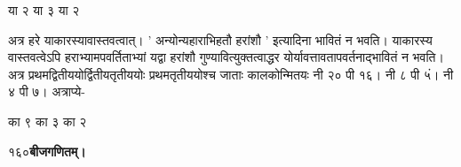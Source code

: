 \documentclass[11pt, openany]{book}
\begin{document}
\begin{sloppypar}
\hspace{0.75in}या २\hspace{0.85in} या ३\hspace{0.8in} या २

\hangindent=0.2in अत्र हरे याकारस्यावास्तवत्वात्। ' अन्योन्यहाराभिहतौ हरांशौ ' इत्यादिना भावितं न भवति। याकारस्य वास्तवत्वेऽपि हराभ्यामपवर्तिताभ्यां यद्वा हरांशौ गुण्यावित्युक्तत्वाद्धर योर्यावत्तावतापवर्तनाद्भावितं न भवति। अत्र प्रथमद्वितीययोर्द्वितीयतृतीययोः प्रथमतृतीययोश्च जाताः कालकोन्मितयः नी २० पी १६। नी ८ पी ५ं। नी ४ पी ७। अत्राप्ये-

\hspace{0.5in}का ९\hspace{0.45in} का ३\hspace{0.45in} का २
\end{sloppypar}
\thispagestyle{empty}
\newpage

\onehalfspacing
१६०\hspace{2in}\textbf{बीजगणितम्।} 

\vspace{5mm}
\end{document}
